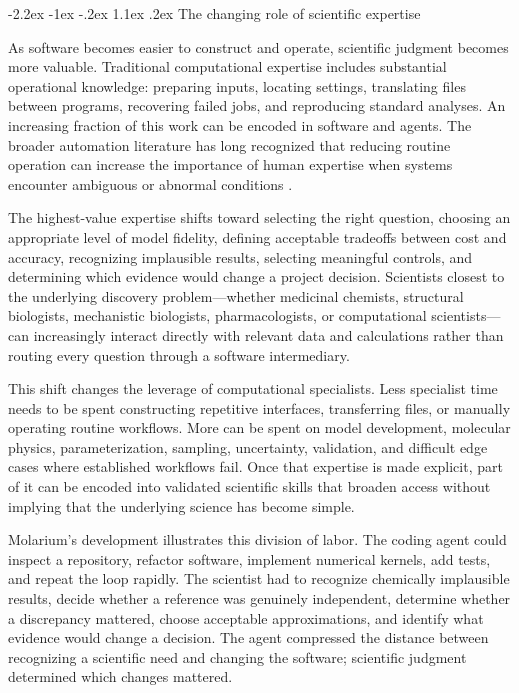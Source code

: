 \documentclass[11pt]{article}
\makeatletter
\renewcommand\section{\@startsection{section}{1}{\z@}%
  {-2.2ex \@plus -1ex \@minus -.2ex}%
  {1.1ex \@plus .2ex}%
  {\normalfont\Large\bfseries\color{molblue}}}
\makeatother
\begin{document}
\section{The changing role of scientific expertise}

As software becomes easier to construct and operate, scientific judgment becomes more valuable. Traditional computational expertise includes substantial operational knowledge: preparing inputs, locating settings, translating files between programs, recovering failed jobs, and reproducing standard analyses. An increasing fraction of this work can be encoded in software and agents. The broader automation literature has long recognized that reducing routine operation can increase the importance of human expertise when systems encounter ambiguous or abnormal conditions \citep{bainbridge1983ironies}.

The highest-value expertise shifts toward selecting the right question, choosing an appropriate level of model fidelity, defining acceptable tradeoffs between cost and accuracy, recognizing implausible results, selecting meaningful controls, and determining which evidence would change a project decision. Scientists closest to the underlying discovery problem---whether medicinal chemists, structural biologists, mechanistic biologists, pharmacologists, or computational scientists---can increasingly interact directly with relevant data and calculations rather than routing every question through a software intermediary.

This shift changes the leverage of computational specialists. Less specialist time needs to be spent constructing repetitive interfaces, transferring files, or manually operating routine workflows. More can be spent on model development, molecular physics, parameterization, sampling, uncertainty, validation, and difficult edge cases where established workflows fail. Once that expertise is made explicit, part of it can be encoded into validated scientific skills that broaden access without implying that the underlying science has become simple.

Molarium's development illustrates this division of labor. The coding agent could inspect a repository, refactor software, implement numerical kernels, add tests, and repeat the loop rapidly. The scientist had to recognize chemically implausible results, decide whether a reference was genuinely independent, determine whether a discrepancy mattered, choose acceptable approximations, and identify what evidence would change a decision. The agent compressed the distance between recognizing a scientific need and changing the software; scientific judgment determined which changes mattered.
\end{document}

